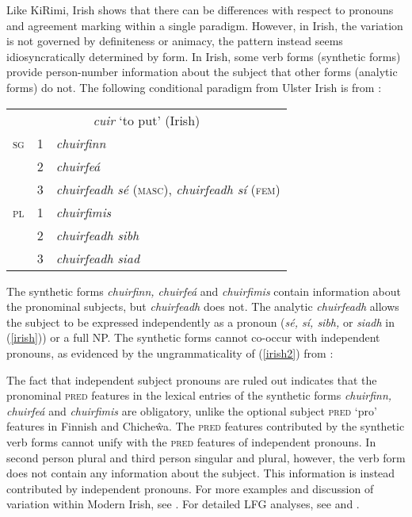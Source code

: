 \documentclass[output=paper,hidelinks]{langscibook}
\begin{document}
  
   




 
  

Like KiRimi, Irish   shows that there can be differences with respect to pronouns and agreement marking   within a  single paradigm. However,  in Irish, the variation is not  governed by definiteness or animacy,  the pattern  instead seems idiosyncratically determined by form.  In Irish, some  verb forms (synthetic forms) provide   person-number information about the subject that other forms (analytic forms) do not.  The following  conditional paradigm  from Ulster Irish is  from \citet{McCloskeyHale1984}:
 

\ea\label{irish}\begin{tabularx}{22em}[t]{lrl}
  \multicolumn{3}{c}{\textit{cuir}  `to put' (Irish)} \\
\textsc{sg}  & 1  & \textit{chuirfinn} \\
& 2  &  \textit{chuirfeá} \\
& 3  &  \textit{chuirfeadh s\'{e} }  \textsc{(masc}),   \textit{chuirfeadh sí }  \textsc{(fem}) \\
\textsc{pl}  & 1  & \textit{chuirfimis} \\
& 2   & \textit{chuirfeadh sibh} \\
&  3  &  \textit{chuirfeadh siad}   \\   \end{tabularx}
\z
The synthetic  forms  \textit{chuirfinn, chuirfeá} and \textit{chuirfimis}  contain information about the pronominal subjects, but   \textit{chuirfeadh} does not. The analytic   \textit{chuirfeadh} allows the subject to be expressed independently  as a pronoun (\textit{s\'{e},  sí, sibh,} or \textit{siadh} in (\ref{irish})) or a full NP.   The synthetic forms cannot co-occur with independent pronouns,  as evidenced by the ungrammaticality of   (\ref{irish2}) from  \citet{McCloskeyHale1984}:

 \z
The fact that independent subject pronouns are ruled out    indicates that  the pro\-nom\-i\-nal \textsc{pred} features in the lexical entries of  the  synthetic forms   \textit{chuirfinn,  chuirfeá}  and \textit{chuirfimis} are obligatory, unlike the  optional  subject \textsc{pred} `pro' features   in Finnish and Chiche\^{w}a.  The \textsc{pred} features contributed by the synthetic verb forms cannot unify with the \textsc{pred} features of independent pronouns. In  second person plural and third person singular and plural, however, the verb form does not contain any information about the subject. This information is instead contributed by independent pronouns.   For more examples and discussion of variation within Modern Irish, see \citet{McCloskeyHale1984}. For detailed LFG analyses,  see \citet{Andrews90} and \citet{Sulger2010}.
\end{document}
